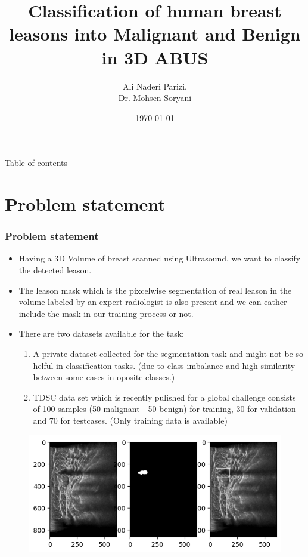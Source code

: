 \documentclass{beamer}
\title{Classification of human breast leasons into \textbf{M}alignant and \textbf{B}enign in 3D ABUS}
\author{Ali Naderi Parizi, \\Dr. Mohsen Soryani}
\date{\today}
\begin{document}
	
\frame{\titlepage} %


\begin{frame}{Table of contents}
\tableofcontents
\end{frame}

\section{Problem statement}
\begin{frame}
	\frametitle{Problem statement}
	\begin{itemize}
		\item Having a 3D Volume of breast scanned using Ultrasound, we want to classify the detected leason.
		\item The leason mask which is the pixcelwise segmentation of real leason in the volume labeled by an expert radiologist is also present and we can eather include the mask in our training process or not. 
		\item There are two datasets available for the task: 
		\begin{enumerate}
			\item A private dataset collected for the segmentation task and might not be so helful in classification tasks. (due to class imbalance and high similarity between some cases in oposite classes.) 
			\item TDSC data set which is recently pulished for a global challenge consists of 100 samples (50 malignant - 50 benign) for training, 30 for validation and 70 for testcases. (Only training data is available)
		\end{enumerate}	
	\end{itemize}
\end{frame}

\begin{frame}
\begin{center}
		\begin{figure}
			\includegraphics[scale=0.8]{Sample.png}
			\centering
		\end{figure}
	\end{center}
\end{frame}
\end{document}
